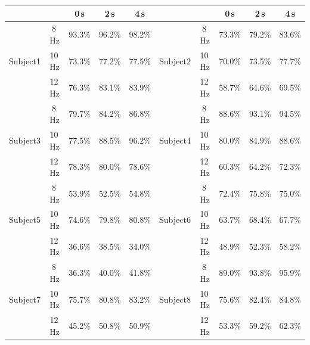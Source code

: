 \documentclass[smallextended]{svjour3}
\begin{document}
\begin{table}[ht]
\begin{center}
    \begin{tabular}{ r | c | c | c | c || r | c | c | c | c }
        \multicolumn{2}{c|}{} & 0\,s & 2\,s & 4\,s & \multicolumn{2}{c|}{} & 0\,s & 2\,s & 4\,s \\ \hline

        \multirow{3}{*}{Subject1} &  8\,Hz & 93.3\% & 96.2\% & 98.2\% & \multirow{3}{*}{Subject2} &  8\,Hz & 73.3\% & 79.2\% & 83.6\% \\
                                  & 10\,Hz & 73.3\% & 77.2\% & 77.5\% & & 10\,Hz & 70.0\% & 73.5\% & 77.7\% \\
                                  & 12\,Hz & 76.3\% & 83.1\% & 83.9\% & & 12\,Hz & 58.7\% & 64.6\% & 69.5\% \\
         
        \hline

        \multirow{3}{*}{Subject3} &  8\,Hz & 79.7\% & 84.2\% & 86.8\% & \multirow{3}{*}{Subject4} &  8\,Hz & 88.6\% & 93.1\% & 94.5\% \\
                                  & 10\,Hz & 77.5\% & 88.5\% & 96.2\% & & 10\,Hz & 80.0\% & 84.9\% & 88.6\% \\
                                  & 12\,Hz & 78.3\% & 80.0\% & 78.6\% & & 12\,Hz & 60.3\% & 64.2\% & 72.3\% \\
        
        \hline

        \multirow{3}{*}{Subject5} &  8\,Hz & 53.9\% & 52.5\% & 54.8\% &  \multirow{3}{*}{Subject6} &  8\,Hz & 72.4\% & 75.8\% & 75.0\% \\
                                  & 10\,Hz & 74.6\% & 79.8\% & 80.8\% & & 10\,Hz & 63.7\% & 68.4\% & 67.7\% \\
                                  & 12\,Hz & 36.6\% & 38.5\% & 34.0\% & & 12\,Hz & 48.9\% & 52.3\% & 58.2\% \\

        \hline

        \multirow{3}{*}{Subject7} &  8\,Hz & 36.3\% & 40.0\% & 41.8\% & \multirow{3}{*}{Subject8} &  8\,Hz & 89.0\% & 93.8\% & 95.9\% \\
                                  & 10\,Hz & 75.7\% & 80.8\% & 83.2\% & & 10\,Hz & 75.6\% & 82.4\% & 84.8\% \\
                                  & 12\,Hz & 45.2\% & 50.8\% & 50.9\% & & 12\,Hz & 53.3\% & 59.2\% & 62.3\% \\


\end{tabular}
\end{center}
\end{table}
\end{document}
